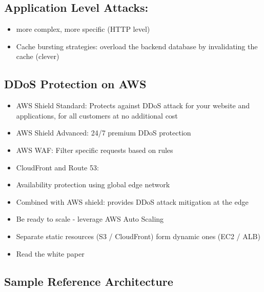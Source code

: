 \subsection{Application Level Attacks:}
\begin{itemize}
    \item more complex, more specific (HTTP level)
    \item Cache bursting strategies: overload the backend database by invalidating the cache (clever)
\end{itemize}

\subsection{DDoS Protection on AWS}
\begin{itemize}
    \item AWS Shield Standard: Protects against DDoS attack for your website and applications, for all customers at no additional cost
    \item AWS Shield Advanced: 24/7 premium DDoS protection
    \item AWS WAF: Filter specific requests based on rules
    \item CloudFront and Route 53:
    \item Availability protection using global edge network
    \item Combined with AWS shield: provides DDoS attack mitigation at the edge
    \item Be ready to scale - leverage AWS Auto Scaling
    \item Separate static resources (S3 / CloudFront) form dynamic ones (EC2 / ALB)
    \item Read the white paper %
\end{itemize}

\subsection{Sample Reference Architecture}

